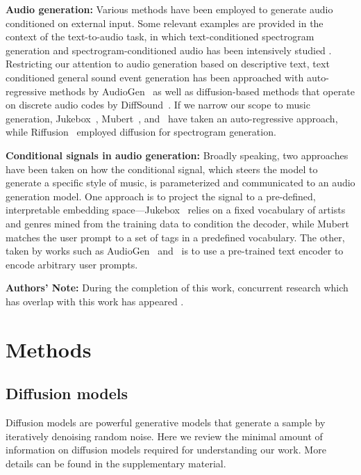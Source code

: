 \noindent\textbf{Audio generation:}
Various methods have been employed to generate audio conditioned on external input. Some relevant examples are provided in the context of the text-to-audio task, in which text-conditioned spectrogram generation and spectrogram-conditioned audio has been intensively studied \cite{popov2021grad, chen2021wavegrad, kong2021diffwave, wu2021otts, chen2022infergrad}. Restricting our attention to audio generation based on descriptive text, text conditioned general sound event generation has been approached with auto-regressive methods by AudioGen~\cite{kreuk2022audiogen} as well as diffusion-based methods that operate on discrete audio codes by DiffSound~\cite{yang2022diffsound}. If we narrow our scope to music generation, Jukebox~\cite{dhariwal2020jukebox}, Mubert~\cite{mubert}, and \MusicLM~have taken an auto-regressive approach, while Riffusion~\cite{Forsgren_Martiros_2022} employed diffusion for spectrogram generation.

\noindent\textbf{Conditional signals in audio generation:}
Broadly speaking, two approaches have been taken on how the conditional signal, which steers the model to generate a specific style of music, is parameterized and communicated to an audio generation model. One approach is to project the signal to a pre-defined, interpretable embedding space---Jukebox~\cite{dhariwal2020jukebox} relies on a fixed vocabulary of artists and genres mined from the training data to condition the decoder, while Mubert~\cite{mubert} matches the user prompt to a set of tags in a predefined vocabulary. The other, taken by works such as AudioGen~\cite{kreuk2022audiogen} and \MusicLM~is to use a pre-trained text encoder to encode arbitrary user prompts.

\noindent\textbf{Authors' Note:}
During the completion of this work, concurrent research which has overlap with this work has appeared \cite{schneider2023}.

\section{Methods}

\subsection{Diffusion models}
\label{ss:diffusion-models}

Diffusion models \cite{sohl2015deep,song2019generative,ho2020denoising} are powerful generative models that generate a sample by iteratively denoising random noise. Here we review the minimal amount of information on diffusion models required for understanding our work. More details can be found in the supplementary material.

